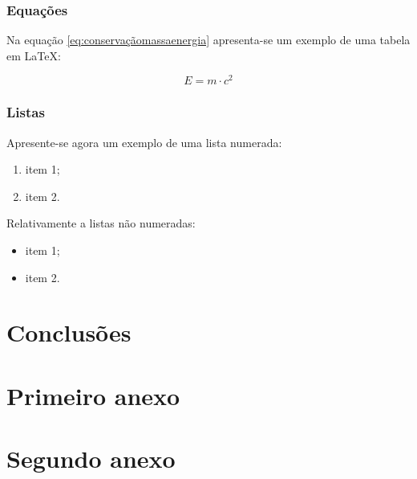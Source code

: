 \documentclass[a4paper,11pt]{article}
\newcommand\tabitem{\setlength{\itemindent}{1cm}}
\newcommand\tab[1][0.8cm]{\hspace*{#1}}
\begin{document}
\subsubsection{Equações}

\tab Na equação \ref{eq:conservaçãomassaenergia} apresenta-se um exemplo de uma tabela em \LaTeX:

\begin{equation}\label{eq:conservaçãomassaenergia}
    E = m \cdot c^{2}
\end{equation}

\subsubsection{Listas}

\tab Apresente-se agora um exemplo de uma lista numerada:

\begin{enumerate}
    \tabitem
    \item item 1;
    \item item 2.
\end{enumerate}

Relativamente a listas não numeradas:

\begin{itemize}
    \tabitem
    \item item 1;
    \item item 2.
\end{itemize}

\pagebreak


\section{Conclusões}

\tab \blindtext


\pagebreak






\printbibliography[title={Referências Bibliográficas}]


\pagebreak





\appendix

\section{Primeiro anexo}

\tab \Blindtext

\pagebreak

\section{Segundo anexo}

\tab \Blindtext

\pagebreak
\end{document}
